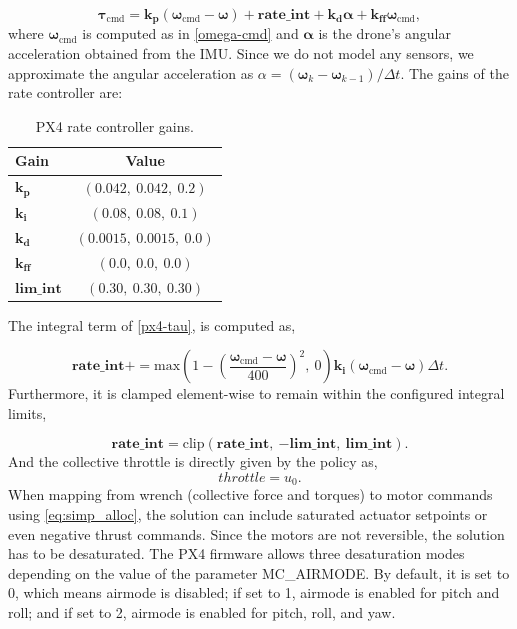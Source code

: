 \begin{equation}\label{px4-tau}
  \boldsymbol{\tau}_{\text{cmd}} = \mathbf{k_p} (\boldsymbol{\omega}_{\text{cmd}} - \boldsymbol{\omega}) + \mathbf{rate\_int} + \mathbf{k_d} \boldsymbol{\alpha} + \mathbf{k_{ff}} \boldsymbol{\omega}_{\text{cmd}},
\end{equation}
where $\boldsymbol{\omega}_\text{cmd}$ is computed as in \eqref{omega-cmd} and $\boldsymbol{\alpha}$ is the drone's angular acceleration obtained from the \ac{IMU}.
Since we do not model any sensors, we approximate the angular acceleration as $ \alpha = (\boldsymbol{\omega}_k - \boldsymbol{\omega}_{k-1}) / \Delta t$.
The gains of the rate controller are:

\begin{table}[H]
  \centering
  \caption{PX4 rate controller gains.}
  \begin{tabular}{l|c}
    \hline
    Gain & Value \\ \hline
    $\mathbf{k_p}$ & $(0.042,\ 0.042,\ 0.2)$ \\
    $\mathbf{k_i}$ & $(0.08,\ 0.08,\ 0.1)$ \\
    $\mathbf{k_d}$ & $(0.0015,\ 0.0015,\ 0.0)$ \\
    $\mathbf{k_{ff}}$ & $(0.0,\ 0.0,\ 0.0)$ \\
    $\mathbf{lim\_int}$ & $(0.30,\ 0.30,\ 0.30)$ \\
    \hline
  \end{tabular}
\end{table}
\noindent The integral term of \autoref{px4-tau}, is computed as,

\begin{equation}
  \mathbf{rate\_int} += \text{max}(1 - (\frac{\boldsymbol{\omega}_{\text{cmd}} - \boldsymbol{\omega}}{400})^2,\ 0) \mathbf{k_i} (\boldsymbol{\omega}_{\text{cmd}} - \boldsymbol{\omega})\Delta t.
\end{equation}
Furthermore, it is clamped element-wise to remain within the configured integral limits,

\begin{equation}
  \mathbf{rate\_int} = \text{clip}(\mathbf{rate\_int},\ \mathbf{-lim\_int},\ \mathbf{lim\_int}).
\end{equation}
And the collective throttle is directly given by the policy as,
\begin{equation}
  throttle = u_0. 
\end{equation}
When mapping from wrench (collective force and torques) to motor commands using \eqref{eq:simp_alloc}, the solution can include saturated actuator setpoints or even negative thrust commands. Since the motors are not reversible, the solution has to be desaturated.
The PX4 firmware allows three desaturation modes depending on the value of the parameter MC\_AIRMODE. By default, it is set to 0, which means airmode is disabled; if set to 1, airmode is enabled for pitch and roll; and if set to 2, airmode is enabled for pitch, roll, and yaw.

